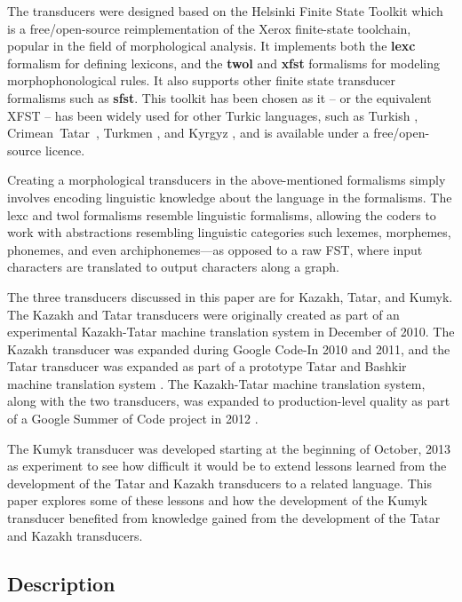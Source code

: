 \documentclass[a4paper,11pt,twocolumn]{article}
\begin{document}
The transducers were designed based on the Helsinki Finite State Toolkit \citep{linden2011} which is a free/open-source reimplementation of the Xerox finite-state toolchain, popular in the field of morphological analysis.  It implements both the \textbf{lexc} formalism for defining lexicons, and the \textbf{twol} and \textbf{xfst} formalisms for modeling morphophonological rules.  It also supports other finite state transducer formalisms such as \textbf{sfst}.  This toolkit has been chosen as it -- or the equivalent XFST -- has been widely used for other Turkic languages, such as Turkish \citep{coltekin2010}, Crimean~Tatar~\citep{altintas2001}, Turkmen \citep{tantug2006}, and Kyrgyz \citep{washington2012}, and is available under a free/open-source licence.

Creating a morphological transducers in the above-mentioned formalisms simply involves encoding linguistic knowledge about the language in the formalisms.  The lexc and twol formalisms resemble linguistic formalisms, allowing the coders to work with abstractions resembling linguistic categories such lexemes, morphemes, phonemes, and even archiphonemes---as opposed to a raw FST, where input characters are translated to output characters along a graph.

The three transducers discussed in this paper are for Kazakh, Tatar, and Kumyk.  The Kazakh and Tatar transducers were originally created as part of an experimental Kazakh-Tatar machine translation system in December of 2010.  The Kazakh transducer was expanded during Google Code-In 2010 and 2011, and the Tatar transducer was expanded as part of a prototype Tatar and Bashkir machine translation system \citep{tyerswashingtonsalimzyanbattalov12}.  The Kazakh-Tatar machine translation system, along with the two transducers, was expanded to production-level quality as part of a Google Summer of Code project in 2012 \citep{salimzyanov2013}.

The Kumyk transducer was developed starting at the beginning of October, 2013 as experiment to see how difficult it would be to extend lessons learned from the development of the Tatar and Kazakh transducers to a related language.  This paper explores some of these lessons and how the development of the Kumyk transducer benefited from knowledge gained from the development of the Tatar and Kazakh transducers.


\subsection{Description}
\end{document}
